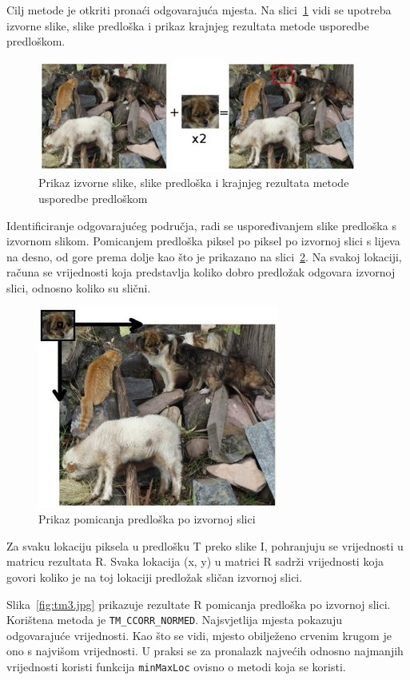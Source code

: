 Cilj metode je otkriti pronaći odgovarajuća mjesta. Na
slici~\ref{fig:tm1.jpg} vidi se upotreba izvorne slike, slike predloška
i prikaz krajnjeg rezultata metode usporedbe predloškom.

\begin{figure}[h]
\centering
\includegraphics[scale=1]{figures/tm1.jpg}
\caption{Prikaz izvorne slike, slike predloška i krajnjeg rezultata
metode usporedbe predloškom}
\label{fig:tm1.jpg}
\end{figure}

Identificiranje odgovarajućeg područja, radi se uspoređivanjem slike
predloška s izvornom slikom. Pomicanjem predloška piksel po piksel po
izvornoj slici s lijeva na desno, od gore prema dolje kao što je
prikazano na slici~\ref{fig:tm2.jpg}. Na svakoj lokaciji, računa se
vrijednosti koja predstavlja koliko dobro predložak odgovara izvornoj
slici, odnosno koliko su slični.

\begin{figure}[h]
\centering
\includegraphics[scale=0.5]{figures/tm2.jpg}
\caption{Prikaz pomicanja predloška po izvornoj slici}
\label{fig:tm2.jpg}
\end{figure}

Za svaku lokaciju piksela u predlošku T preko slike I, pohranjuju se
vrijednosti u matricu rezultata R. Svaka lokacija (x, y) u matrici R
sadrži vrijednosti koja govori koliko je na toj lokaciji predložak
sličan izvornoj slici. 

Slika~\ref{fig:tm3.jpg} prikazuje rezultate R pomicanja predloška po
izvornoj slici. Korištena metoda je \texttt{TM\_CCORR\_NORMED}.
Najsvjetlija mjesta pokazuju odgovarajuće vrijednosti. Kao što se vidi,
mjesto obilježeno crvenim krugom je ono s najvišom vrijednosti. U praksi
se za pronalazk najvećih odnosno najmanjih vrijednosti koristi funkcija
\texttt{minMaxLoc} ovisno o metodi koja se koristi.


